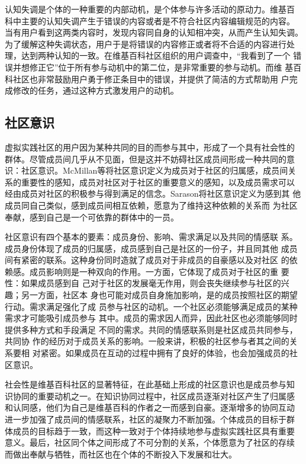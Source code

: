 认知失调是个体的一种重要的内部动机，是个体参与许多活动的原动力。维基百
科中主要的认知失调产生于错误的内容或者是不符合社区内容编辑规范的内容。
当有用户看到这两类内容时，发现内容同自身的认知相冲突，从而产生认知失调。
为了缓解这种失调状态，用户于是将错误的内容修正或者将不合适的内容进行处
理，达到两种认知的一致。在维基百科社区组织的用户调查中，“我看到了一个
错误并想修正它”位于所有参与动机中的第二位，是非常重要的参与动机。而维
基百科社区也非常鼓励用户勇于修正条目中的错误，并提供了简洁的方式帮助用
户完成修改的任务，通过这种方式激发用户的动机。

\subsection{社区意识}
\label{sec:sense-of-belongings}

虚拟实践社区的用户因为某种共同的目的而参与其中，形成了一个具有社会性的
群体。尽管成员间几乎从不见面，但是这并不妨碍社区成员间形成一种共同的意
识：社区意识。McMillan等将社区意识定义为成员对于社区的归属感，成员间关
系的重要性的感知，成员对社区对于社区的重要意义的感知，以及成员需求可以
经由成员对社区的积极参与得到满足的信念\cite{mcmillan1986sense}。Sarason将社区意识定义为感到其
他成员同自己类似，感到成员间相互依赖，愿意为了维持这种依赖的关系而
为社区奉献，感到自己是一个可依靠的群体中的一员\cite{sarason1988psychological}。

社区意识有四个基本的要素：成员身份、影响、需求满足以及共同的情感联
系。成员身份体现了成员的归属感，成员感到自己是社区的一份子，并且同其他
成员间有紧密的联系。这种身份同时造就了成员对于非成员的自豪感以及对社区
的依赖感。成员影响则是一种双向的作用。一方面，它体现了成员对于社区的重
要性：如果成员感到自
己对于社区的发展毫无作用，则会丧失继续参与社区的兴趣；另一方面，社区本
身也可能对成员自身施加影响，是的成员按照社区的期望行动。需求满足强化了成
员参与社区的动机。一个社区必须能够满足成员的某种需求才可能吸引成员参与
其中。成员的需求因人而异，因此社区也必须能够同时提供多种方式和手段满足
不同的需求。共同的情感联系则是社区成员共同参与，共同协
作的经历对于成员关系的影响。一般来讲，积极的社区参与者其之间的关系要相
对紧密。如果成员在互动的过程中拥有了良好的体验，也会加强成员的社区意识。

社会性是维基百科社区的显著特征，在此基础上形成的社区意识也是成员参与知
识协同的重要动机之一。在知识协同过程中，社区成员逐渐对社区产生了归属感
和认同感，他们为自己是维基百科的作者之一而感到自豪。逐渐增多的协同互动
进一步加强了成员间的情感联系，社区的凝聚力不断加强。个体成员的目标于群
体成员的目标趋于一致，而这种一致对于个体持续地参与虚拟实践社区具有重要
意义。最后，社区同个体之间形成了不可分割的关系，个体愿意为了社区的存续
而做出奉献与牺牲，而社区也在个体的不断投入下发展和壮大。



